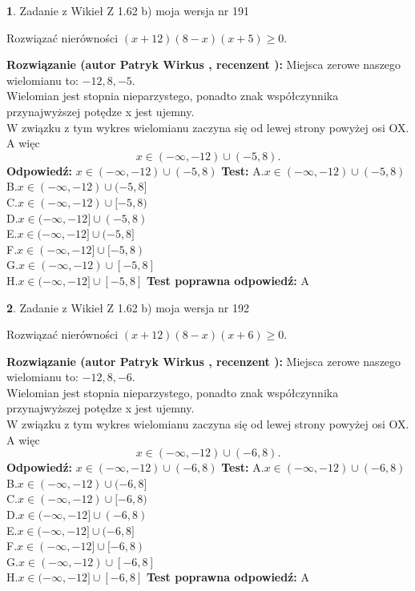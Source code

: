 \documentclass[12pt, a4paper]{article}
\theoremstyle{definition} %
\newtheorem{zad}{}
\newcommand{\zadStart}[1]{\begin{zad}#1\newline}
\newcommand{\zadStop}{\end{zad}}
\newcommand{\rozwStart}[2]{\noindent \textbf{Rozwiązanie (autor #1 , recenzent #2): }\newline}
\newcommand{\rozwStop}{\newline}
\newcommand{\odpStart}{\noindent \textbf{Odpowiedź:}\newline}
\newcommand{\odpStop}{\newline}
\newcommand{\testStart}{\noindent \textbf{Test:}\newline}
\newcommand{\testStop}{\newline}
\newcommand{\kluczStart}{\noindent \textbf{Test poprawna odpowiedź:}\newline}
\newcommand{\kluczStop}{\newline}
\begin{document}
\zadStart{Zadanie z Wikieł Z 1.62 b) moja wersja nr 191}

Rozwiązać nierówności $(x+12)(8-x)(x+5)\ge0$.
\zadStop
\rozwStart{Patryk Wirkus}{}
Miejsca zerowe naszego wielomianu to: $-12, 8, -5$.\\
Wielomian jest stopnia nieparzystego, ponadto znak współczynnika przy\linebreak najwyższej potędze x jest ujemny.\\ W związku z tym wykres wielomianu zaczyna się od lewej strony powyżej osi OX. A więc $$x \in (-\infty,-12) \cup (-5,8).$$
\rozwStop
\odpStart
$x \in (-\infty,-12) \cup (-5,8)$
\odpStop
\testStart
A.$x \in (-\infty,-12) \cup (-5,8)$\\
B.$x \in (-\infty,-12) \cup (-5,8]$\\
C.$x \in (-\infty,-12) \cup [-5,8)$\\
D.$x \in (-\infty,-12] \cup (-5,8)$\\
E.$x \in (-\infty,-12] \cup (-5,8]$\\
F.$x \in (-\infty,-12] \cup [-5,8)$\\
G.$x \in (-\infty,-12) \cup [-5,8]$\\
H.$x \in (-\infty,-12] \cup [-5,8]$
\testStop
\kluczStart
A
\kluczStop



\zadStart{Zadanie z Wikieł Z 1.62 b) moja wersja nr 192}

Rozwiązać nierówności $(x+12)(8-x)(x+6)\ge0$.
\zadStop
\rozwStart{Patryk Wirkus}{}
Miejsca zerowe naszego wielomianu to: $-12, 8, -6$.\\
Wielomian jest stopnia nieparzystego, ponadto znak współczynnika przy\linebreak najwyższej potędze x jest ujemny.\\ W związku z tym wykres wielomianu zaczyna się od lewej strony powyżej osi OX. A więc $$x \in (-\infty,-12) \cup (-6,8).$$
\rozwStop
\odpStart
$x \in (-\infty,-12) \cup (-6,8)$
\odpStop
\testStart
A.$x \in (-\infty,-12) \cup (-6,8)$\\
B.$x \in (-\infty,-12) \cup (-6,8]$\\
C.$x \in (-\infty,-12) \cup [-6,8)$\\
D.$x \in (-\infty,-12] \cup (-6,8)$\\
E.$x \in (-\infty,-12] \cup (-6,8]$\\
F.$x \in (-\infty,-12] \cup [-6,8)$\\
G.$x \in (-\infty,-12) \cup [-6,8]$\\
H.$x \in (-\infty,-12] \cup [-6,8]$
\testStop
\kluczStart
A
\kluczStop
\end{document}
